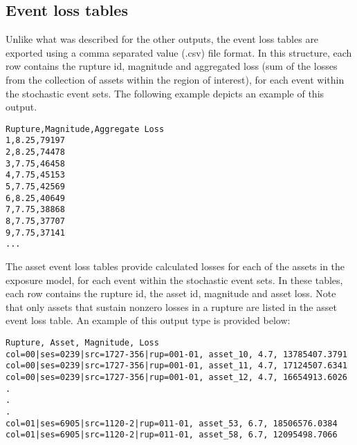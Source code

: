 \subsection{Event loss tables}
Unlike what was described for the other outputs, the event loss tables are exported using a comma separated value (.csv) file format. In this structure, each row contains the rupture id, magnitude and aggregated loss (sum of the losses from the collection of assets within the region of interest), for each event within the stochastic event sets. The following example depicts an example of this output.

\begin{Verbatim}[frame=single, commandchars=\\\{\}, samepage=false]
Rupture,Magnitude,Aggregate Loss
1,8.25,79197
2,8.25,74478
3,7.75,46458
4,7.75,45153
5,7.75,42569
6,8.25,40649
7,7.75,38868
8,7.75,37707
9,7.75,37141
...
\end{Verbatim}

The asset event loss tables provide calculated losses for each of the assets in the exposure model, for each event within the stochastic event sets. In these tables, each row contains the rupture id, the asset id, magnitude and asset loss. Note that only assets that sustain nonzero losses in a rupture are listed in the asset event loss table. An example of this output type is provided below:

\begin{Verbatim}[frame=single, commandchars=\\\{\}, samepage=false]
Rupture, Asset, Magnitude, Loss
col=00|ses=0239|src=1727-356|rup=001-01, asset_10, 4.7, 13785407.3791
col=00|ses=0239|src=1727-356|rup=001-01, asset_11, 4.7, 17124507.6341
col=00|ses=0239|src=1727-356|rup=001-01, asset_12, 4.7, 16654913.6026
.
.
.
col=01|ses=6905|src=1120-2|rup=011-01, asset_53, 6.7, 18506576.0384
col=01|ses=6905|src=1120-2|rup=011-01, asset_58, 6.7, 12095498.7066
\end{Verbatim}
